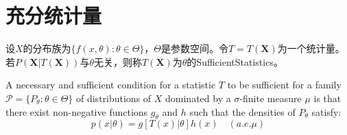 \section{充分统计量}

\begin{definition}
	设$X$的分布族为$\{f(x,\theta):\theta\in\Theta\}$，$\Theta$是参数空间。令$T=T(\mathbf{X})$为一个统计量。若$P(\mathbf{X}|T(\mathbf{X}))$与$\theta$无关，则称$T(\mathbf{X})$为$\theta$的\gls{SufficientStatistics}。
\end{definition}
\begin{theorem}
	\label{theo:FactorizationTheorem}
	A necessary and sufficient condition for a statistic $T$ to be sufficient for a family $\mathcal{P}=\{P_\theta:\theta\in\Theta\}$ of distributions of $X$ dominated by a $\sigma$-finite measure $\mu$ is that there exist non-negative functions $g_\theta$ and $h$ such that the densities of $P_\theta$ satisfy:
	\begin{equation*}
		p(x|\theta)=g[T(x)|\theta]h(x)\quad(a.e.\mu)
	\end{equation*}
\end{theorem}